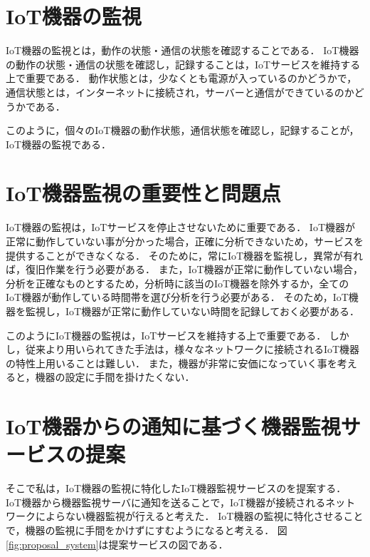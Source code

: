 \section{IoT機器の監視}%
IoT機器の監視とは，動作の状態・通信の状態を確認することである．
IoT機器の動作の状態・通信の状態を確認し，記録することは，IoTサービスを維持する上で重要である．
動作状態とは，少なくとも電源が入っているのかどうかで，通信状態とは，インターネットに接続され，サーバーと通信ができているのかどうかである．
\medskip

このように，個々のIoT機器の動作状態，通信状態を確認し，記録することが，IoT機器の監視である．

\section{IoT機器監視の重要性と問題点}
IoT機器の監視は，IoTサービスを停止させないために重要である．
IoT機器が正常に動作していない事が分かった場合，正確に分析できないため，サービスを提供することができなくなる．
そのために，常にIoT機器を監視し，異常が有れば，復旧作業を行う必要がある．
また，IoT機器が正常に動作していない場合，分析を正確なものとするため，分析時に該当のIoT機器を除外するか，全てのIoT機器が動作している時間帯を選び分析を行う必要がある．
そのため，IoT機器を監視し，IoT機器が正常に動作していない時間を記録しておく必要がある．
\medskip

このようにIoT機器の監視は，IoTサービスを維持する上で重要である．
しかし，従来より用いられてきた手法は，様々なネットワークに接続されるIoT機器の特性上用いることは難しい．
また，機器が非常に安価になっていく事を考えると，機器の設定に手間を掛けたくない．

\section{IoT機器からの通知に基づく機器監視サービスの提案}
そこで私は，IoT機器の監視に特化したIoT機器監視サービスのを提案する．
IoT機器から機器監視サーバに通知を送ることで，IoT機器が接続されるネットワークによらない機器監視が行えると考えた．
IoT機器の監視に特化させることで，機器の監視に手間をかけずにすむようになると考える．
図\ref{fig:proposal_system}は提案サービスの図である．


